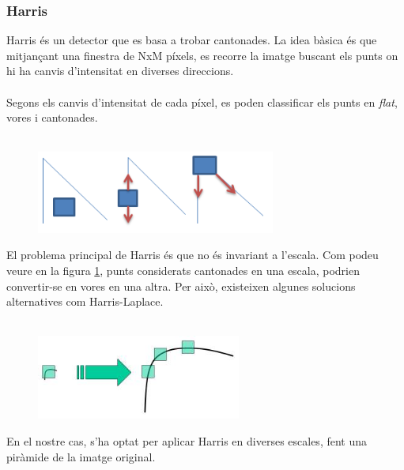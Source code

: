 	\subsubsection{Harris}
	Harris és un detector que es basa a trobar cantonades. La idea bàsica és que mitjançant una finestra de NxM píxels, es recorre la imatge buscant els punts on hi ha canvis d'intensitat
	en diverses direccions.\\\\
	Segons els canvis d'intensitat de cada píxel, es poden classificar els punts en \textit{flat}, vores i cantonades.\\\\
	\begin{figure}[H]
		\centering
		\includegraphics[width=0.7\textwidth]{images/harris}
	\end{figure}
	\noindent
	El problema principal de Harris és que no és invariant a l'escala. Com podeu veure en la figura \ref{fig:vores}, punts considerats cantonades en una escala,
	podrien convertir-se en vores en una altra. Per això, existeixen algunes solucions alternatives com Harris-Laplace.\\\\

	\begin{figure}[H]
		\centering
		\includegraphics[width=0.6\textwidth]{images/scale_invariant}
		\label{fig:vores}
	\end{figure}
	\noindent
	En el nostre cas, s'ha optat per aplicar Harris en diverses escales, fent una piràmide de la imatge original.

